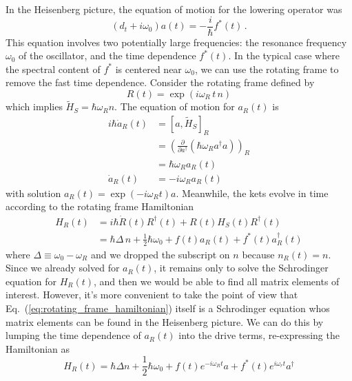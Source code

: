In the Heisenberg picture, the equation of motion for the lowering operator was
\begin{equation*}
  \left( d_t + i \omega_0 \right) a(t) = -\frac{i}{\hbar} f^*(t)
  \, .
\end{equation*}
This equation involves two potentially large frequencies: the resonance frequency $\omega_0$ of the oscillator, and the time dependence $f^*(t)$.
In the typical case where the spectral content of $f^*$ is centered near $\omega_0$, we can use the rotating frame to remove the fast time dependence.
Consider the rotating frame defined by
\begin{equation*}
  R(t) = \exp(i \omega_R \, t \, n)
\end{equation*}
which implies $\tilde{H}_S = \hbar \omega_R n$.
The equation of motion for $a_R(t)$ is
\begin{align*}
  i \hbar \dot{a}_R(t)
  &= \left[ a, \tilde{H}_S \right]_R \\
  &= \left(
    \frac{\partial}{\partial a^\dagger} \left( \hbar \omega_R a^\dagger a \right)
    \right)_R \\
  &= \hbar \omega_R a_R(t) \\
  \dot{a}_R(t)
  &= -i \omega_R a_R(t)
\end{align*}
with solution $a_R(t) = \exp(-i \omega_R t) a$.
Meanwhile, the kets evolve in time according to the rotating frame Hamiltonian
\begin{align}
  H_R(t)
  &= i \hbar \dot{R}(t) R^\dagger(t) + R(t) H_S(t) R^\dagger(t) \nonumber \\
  &= \hbar \Delta \, n + \frac{1}{2} \hbar \omega_0 + f(t) a_R(t) + f^*(t) a_R^\dagger(t)
  \label{eq:rotating_frame_hamiltonian}
\end{align}
where $\Delta \equiv \omega_0 - \omega_R$ and we dropped the subscript on $n$ because $n_R(t) = n$.
Since we already solved for $a_R(t)$, it remains only to solve the Schrodinger equation for $H_R(t)$, and then we would be able to find all matrix elements of interest.
However, it's more convenient to take the point of view that Eq.~(\ref{eq:rotating_frame_hamiltonian}) itself is a Schrodinger equation whos matrix elements can be found in the Heisenberg picture.
We can do this by lumping the time dependence of $a_R(t)$ into the drive terms, re-expressing the Hamiltonian as
\begin{equation}
  H_R(t) = \hbar \Delta n + \frac{1}{2}\hbar \omega_0 + f(t)e^{-i \omega_R t} a + f^*(t) e^{i \omega_r t} a^\dagger
\end{equation}
